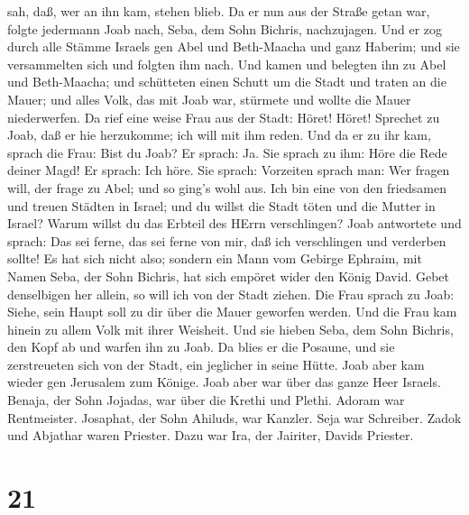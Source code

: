 sah, daß, wer an ihn kam, stehen blieb.  Da er nun aus der
Straße getan war, folgte jedermann Joab nach, Seba, dem Sohn Bichris,
nachzujagen.  Und er zog durch alle Stämme Israels gen Abel
und Beth-Maacha und ganz Haberim; und sie versammelten sich und folgten
ihm nach.  Und kamen und belegten ihn zu Abel und
Beth-Maacha; und schütteten einen Schutt um die Stadt und traten an die
Mauer; und alles Volk, das mit Joab war, stürmete und wollte die Mauer
niederwerfen.  Da rief eine weise Frau aus der Stadt:
Höret! Höret! Sprechet zu Joab, daß er hie herzukomme; ich will mit ihm
reden.  Und da er zu ihr kam, sprach die Frau: Bist du
Joab? Er sprach: Ja. Sie sprach zu ihm: Höre die Rede deiner Magd! Er
sprach: Ich höre.  Sie sprach: Vorzeiten sprach man: Wer
fragen will, der frage zu Abel; und so ging's wohl aus. 
Ich bin eine von den friedsamen und treuen Städten in Israel; und du
willst die Stadt töten und die Mutter in Israel? Warum willst du das
Erbteil des HErrn verschlingen?  Joab antwortete und
sprach: Das sei ferne, das sei ferne von mir, daß ich verschlingen und
verderben sollte! Es hat sich nicht also;  sondern ein Mann
vom Gebirge Ephraim, mit Namen Seba, der Sohn Bichris, hat sich empöret
wider den König David. Gebet denselbigen her allein, so will ich von der
Stadt ziehen. Die Frau sprach zu Joab: Siehe, sein Haupt soll zu dir
über die Mauer geworfen werden.  Und die Frau kam hinein zu
allem Volk mit ihrer Weisheit. Und sie hieben Seba, dem Sohn Bichris,
den Kopf ab und warfen ihn zu Joab. Da blies er die Posaune, und sie
zerstreueten sich von der Stadt, ein jeglicher in seine Hütte. Joab aber
kam wieder gen Jerusalem zum Könige.  Joab aber war über
das ganze Heer Israels. Benaja, der Sohn Jojadas, war über die Krethi
und Plethi.  Adoram war Rentmeister. Josaphat, der Sohn
Ahiluds, war Kanzler.  Seja war Schreiber. Zadok und
Abjathar waren Priester.  Dazu war Ira, der Jairiter,
Davids Priester.

\hypertarget{section-20}{%
\section{21}\label{section-20}}

